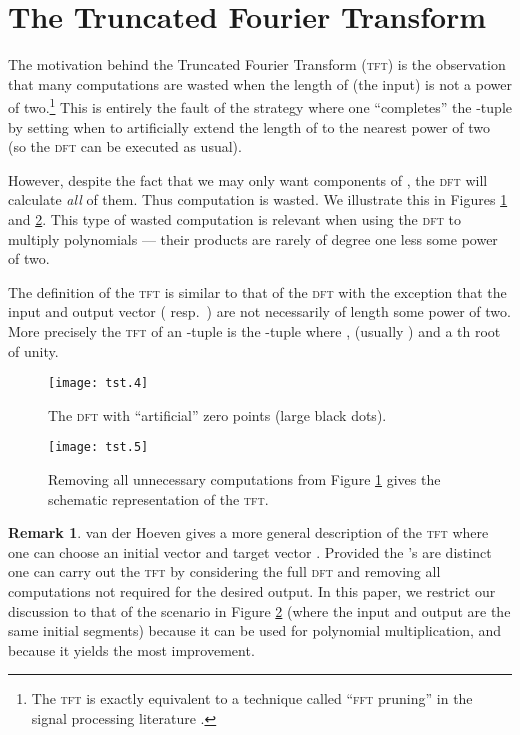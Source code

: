 \documentclass[12pt]{article}
\theoremstyle{definition}
\newcommand{\0}{\mathbf{0}}
\theoremstyle{theorem}
\theoremstyle{definition}
\newtheorem*{remark}{Remark}
\begin{document}
\FloatBarrier

\section{The Truncated Fourier Transform}\label{Section::TFT}
The motivation behind the Truncated Fourier Transform (\textsc{tft}) is the observation that many computations are wasted when the length of  (the input) is not a power of two.\footnote{The \textsc{tft} is exactly equivalent to a technique called ``\textsc{fft} pruning'' in the signal processing literature \cite{SigProcessing}.} This is entirely the fault of the strategy where one ``completes'' the -tuple  by setting  when  to artificially extend the length of  to the nearest power of two (so the \textsc{dft} can be executed as usual).

However, despite the fact that we may only want  components of , the \textsc{dft} will calculate \emph{all} of them. Thus computation is wasted. We illustrate this in Figures \ref{OverFFT} and \ref{TFT0}. This type of wasted computation is relevant when using the \textsc{dft} to multiply polynomials --- their products are rarely of degree one less some power of two.

The definition of the \textsc{tft} is similar to that of the \textsc{dft} with the exception that the input and output vector ( resp.\ ) are not necessarily of length some power of two.  More precisely the \textsc{tft} of an -tuple  is the -tuple 
where ,  (usually ) and  a th root of unity. 


\begin{figure}[htbp]
\begin{center}
\texttt{[image: tst.4]}
\caption{The \textsc{dft} with ``artificial'' zero points (large black dots).}
\label{OverFFT}
\end{center}
\end{figure}

\begin{figure}[htbp]
\begin{center}
\texttt{[image: tst.5]}
\caption{Removing all unnecessary computations from Figure \ref{OverFFT} gives the schematic representation of the \textsc{tft}.}
\label{TFT0}
\end{center}
\end{figure}

\begin{remark}
van der Hoeven \cite{TFT2} gives a more general description of the \textsc{tft} where one can choose an initial vector  and target vector . Provided the 's are distinct one can carry out the \textsc{tft} by considering the full \textsc{dft} and removing all computations not required for the desired output. In this paper, we restrict our discussion to that of the scenario in Figure \ref{TFT0} (where the input and output are the same initial segments) because it can be used for polynomial multiplication, and because it yields the most improvement. 
\end{remark}
\end{document}
